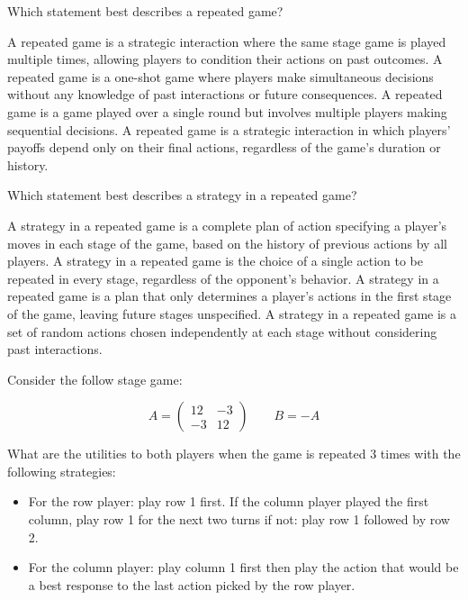 \documentclass{exam}
\begin{document}
\begin{questions}
        
    \question
    Which statement best describes a repeated game?

    \begin{checkboxes}
        \choice A repeated game is a strategic interaction where the same stage game is played multiple times, allowing players to condition their actions on past outcomes.
        \choice A repeated game is a one-shot game where players make simultaneous decisions without any knowledge of past interactions or future consequences.            
        \choice A repeated game is a game played over a single round but involves multiple players making sequential decisions.
        \choice A repeated game is a strategic interaction in which players’ payoffs depend only on their final actions, regardless of the game's duration or history.
    \end{checkboxes}

    \question
    Which statement best describes a strategy in a repeated game?

    \begin{checkboxes}
        \choice A strategy in a repeated game is a complete plan of action specifying a player's moves in each stage of the game, based on the history of previous actions by all players.
        \choice A strategy in a repeated game is the choice of a single action to be repeated in every stage, regardless of the opponent's behavior.            
        \choice A strategy in a repeated game is a plan that only determines a player's actions in the first stage of the game, leaving future stages unspecified.
        \choice A strategy in a repeated game is a set of random actions chosen independently at each stage without considering past interactions.
    \end{checkboxes}

    \question
    Consider the follow stage game:

    \[
        A = \begin{pmatrix}
            12 & -3\\
            -3 & 12
            \end{pmatrix}
            \qquad
        B = -A
    \]

    What are the utilities to both players when the game is repeated 3 times
    with the following strategies:

    \begin{itemize}
        \item For the row player: play row 1 first. If the column player played the
    first column, play row 1 for the next two turns if not: play row 1 followed
    by row 2.
        \item For the column player: play column 1 first then play the action that would
      be a best response to the last action picked by the row player.
    \end{itemize}


\end{questions}
\end{document}

